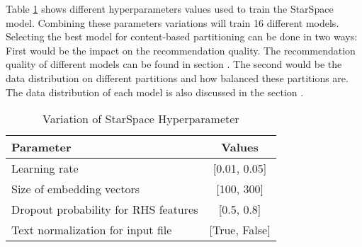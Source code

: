 Table \ref{tab:hyperparameter-variations} shows different hyperparameters values used to train the StarSpace model. Combining these parameters variations will train 16 different models. Selecting the best model for content-based partitioning can be done in two ways: First would be the impact on the recommendation quality. The recommendation quality of different models can be found in section . The second would be the data distribution on different partitions and how balanced these partitions are. The data distribution of each model is also discussed in the section .


\begin{table}[!h]
	\centering
	\caption{Variation of StarSpace Hyperparameter}
	\label{tab:hyperparameter-variations}
	\begin{tabular}{|l|c|}
		\hline
		\textbf{Parameter} & \textbf{Values} \\
		\hline
		Learning rate & [0.01, 0.05] \\
		\hline
		Size of embedding vectors & [100, 300] \\
		\hline
		Dropout probability for RHS features & [0.5, 0.8] \\
		\hline
		Text normalization for input file & [True, False]\\
		\hline
	\end{tabular}
\end{table}

